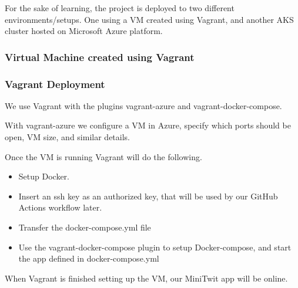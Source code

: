 For the sake of learning, the project is deployed to two different environments/setups. One using a VM created using Vagrant, and another AKS cluster hosted on Microsoft Azure platform.
\subsubsection{Virtual Machine created using Vagrant}      

\subsubsection*{Vagrant Deployment}
We use Vagrant with the plugins vagrant-azure and vagrant-docker-compose.

\noindent With vagrant-azure we configure a VM in Azure, specify which ports should be open, VM size, and similar details.

\noindent Once the VM is running Vagrant will do the following.
\begin{itemize}
\item Setup Docker.
\item Insert an ssh key as an authorized key, that will be used by our GitHub Actions workflow later.
\item Transfer the docker-compose.yml file
\item Use the vagrant-docker-compose plugin to setup Docker-compose, and start the app defined in docker-compose.yml
\end{itemize}

When Vagrant is finished setting up the VM, our MiniTwit app will be online.

